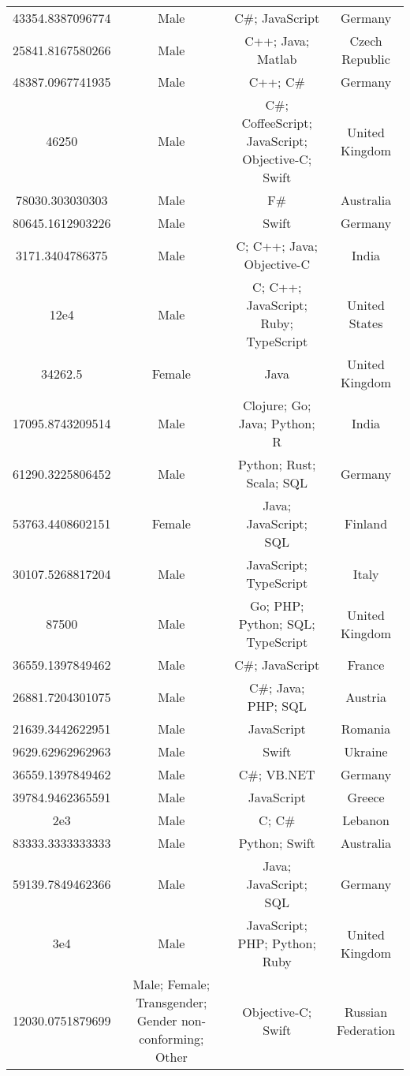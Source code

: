 \begin{center}
\begin{tabular}{ |c|c|c|c| }
43354.8387096774  &  Male  &  C\#; JavaScript  &  Germany  \\ 
25841.8167580266  &  Male  &  C++; Java; Matlab  &  Czech Republic  \\ 
48387.0967741935  &  Male  &  C++; C\#  &  Germany  \\ 
46250  &  Male  &  C\#; CoffeeScript; JavaScript; Objective-C; Swift  &  United Kingdom  \\ 
78030.303030303  &  Male  &  F\#  &  Australia  \\ 
80645.1612903226  &  Male  &  Swift  &  Germany  \\ 
3171.3404786375  &  Male  &  C; C++; Java; Objective-C  &  India  \\ 
12e4  &  Male  &  C; C++; JavaScript; Ruby; TypeScript  &  United States  \\ 
34262.5  &  Female  &  Java  &  United Kingdom  \\ 
17095.8743209514  &  Male  &  Clojure; Go; Java; Python; R  &  India  \\ 
61290.3225806452  &  Male  &  Python; Rust; Scala; SQL  &  Germany  \\ 
53763.4408602151  &  Female  &  Java; JavaScript; SQL  &  Finland  \\ 
30107.5268817204  &  Male  &  JavaScript; TypeScript  &  Italy  \\ 
87500  &  Male  &  Go; PHP; Python; SQL; TypeScript  &  United Kingdom  \\ 
36559.1397849462  &  Male  &  C\#; JavaScript  &  France  \\ 
26881.7204301075  &  Male  &  C\#; Java; PHP; SQL  &  Austria  \\ 
21639.3442622951  &  Male  &  JavaScript  &  Romania  \\ 
9629.62962962963  &  Male  &  Swift  &  Ukraine  \\ 
36559.1397849462  &  Male  &  C\#; VB.NET  &  Germany  \\ 
39784.9462365591  &  Male  &  JavaScript  &  Greece  \\ 
2e3  &  Male  &  C; C\#  &  Lebanon  \\ 
83333.3333333333  &  Male  &  Python; Swift  &  Australia  \\ 
59139.7849462366  &  Male  &  Java; JavaScript; SQL  &  Germany  \\ 
3e4  &  Male  &  JavaScript; PHP; Python; Ruby  &  United Kingdom  \\ 
12030.0751879699  &  Male; Female; Transgender; Gender non-conforming; Other  &  Objective-C; Swift  &  Russian Federation  \\ 

\end{tabular}
\end{center}
